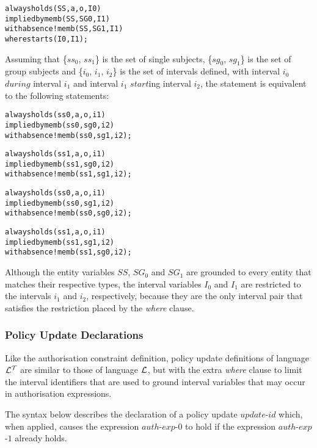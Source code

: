 \documentclass[11pt]{report}
\newenvironment{vverbatim}
{
  \begin{alltt}
}
{
    \vspace{-\baselineskip}
  \end{alltt}
}
\begin{document}
          \begin{vverbatim}
  always holds(SS, a, o, I0)
    implied by memb(SS, SG0, I1)
    with absence !memb(SS, SG1, I1)
    where starts(I0, I1);
          \end{vverbatim}

          \noindent
          Assuming that \{$ss_0$, $ss_1$\} is the set of single subjects,
          \{$sg_0$, $sg_1$\} is the set of group subjects and \{$i_0$, $i_1$,
          $i_2$\} is the set of intervals defined, with interval $i_0$ $during$
          interval $i_1$ and interval $i_1$ $start$ing interval $i_2$, the
          statement is equivalent to the following statements:

          \begin{vverbatim}
  always holds(ss0, a, o, i1)
    implied by memb(ss0, sg0, i2)
    with absence !memb(ss0, sg1, i2);

  always holds(ss1, a, o, i1)
    implied by memb(ss1, sg0, i2)
    with absence !memb(ss1, sg1, i2);

  always holds(ss0, a, o, i1)
    implied by memb(ss0, sg1, i2)
    with absence !memb(ss0, sg0, i2);

  always holds(ss1, a, o, i1)
    implied by memb(ss1, sg1, i2)
    with absence !memb(ss1, sg0, i2);
          \end{vverbatim}

          Although the entity variables $SS$, $SG_0$ and $SG_1$ are grounded
          to every entity that matches their respective types, the interval
          variables $I_0$ and $I_1$ are restricted to the intervals $i_1$ and
          $i_2$, respectively, because they are the only interval pair that
          satisfies the restriction placed by the {\em where} clause.

        \subsubsection{Policy Update Declarations}

          Like the authorisation constraint definition, policy update
          definitions of language ${\cal L^T}$ are similar to those of language
          ${\cal L}$, but with the extra {\em where} clause to limit the
          interval identifiers that are used to ground interval variables that
          may occur in authorisation expressions.

          The syntax below describes the declaration of a policy update
          $update$-$id$ which, when applied, causes the expression
          $auth$-$exp$-$0$ to hold if the expression $auth$-$exp$-$1$ already
          holds.
\end{document}
